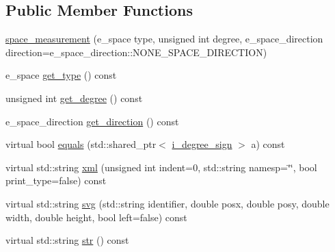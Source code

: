 \subsection*{Public Member Functions}
\begin{DoxyCompactItemize}
\item 
\hyperlink{classmae_1_1fl_1_1laban_1_1mv_1_1space__measurement_ab8570e2e08f53abf9f8839fd0707ee33}{space\-\_\-measurement} (e\-\_\-space type, unsigned int degree, e\-\_\-space\-\_\-direction direction=e\-\_\-space\-\_\-direction\-::\-N\-O\-N\-E\-\_\-\-S\-P\-A\-C\-E\-\_\-\-D\-I\-R\-E\-C\-T\-I\-O\-N)
\item 
e\-\_\-space \hyperlink{classmae_1_1fl_1_1laban_1_1mv_1_1space__measurement_a6e49ae9e3c7a2c5b501b07835588f9cb}{get\-\_\-type} () const 
\item 
unsigned int \hyperlink{classmae_1_1fl_1_1laban_1_1mv_1_1space__measurement_a8ea28ebbc7ed2dbf875cb6be9e23798c}{get\-\_\-degree} () const 
\item 
e\-\_\-space\-\_\-direction \hyperlink{classmae_1_1fl_1_1laban_1_1mv_1_1space__measurement_a397a6a25188f5402a514c259b23ced78}{get\-\_\-direction} () const 
\item 
virtual bool \hyperlink{classmae_1_1fl_1_1laban_1_1mv_1_1space__measurement_a3dd6b152d30ec2d8cf62933f09e445cd}{equals} (std\-::shared\-\_\-ptr$<$ \hyperlink{classmae_1_1fl_1_1laban_1_1mv_1_1i__degree__sign}{i\-\_\-degree\-\_\-sign} $>$ a) const 
\item 
virtual std\-::string \hyperlink{classmae_1_1fl_1_1laban_1_1mv_1_1space__measurement_ab4121b6344f7dcbb4b7d11a3545de50a}{xml} (unsigned int indent=0, std\-::string namesp=\char`\"{}\char`\"{}, bool print\-\_\-type=false) const 
\item 
virtual std\-::string \hyperlink{classmae_1_1fl_1_1laban_1_1mv_1_1space__measurement_af68cab95083ca91bc99a9a45edc7ea86}{svg} (std\-::string identifier, double posx, double posy, double width, double height, bool left=false) const 
\item 
virtual std\-::string \hyperlink{classmae_1_1fl_1_1laban_1_1mv_1_1space__measurement_a58c0ec3d959b60b381441cf65cc1684a}{str} () const 
\end{DoxyCompactItemize}
